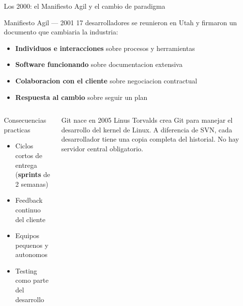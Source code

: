 \documentclass[aspectratio=169]{beamer}
\begin{document}
\begin{frame}{Los 2000: el Manifiesto Agil y el cambio de paradigma}
  \begin{block}{Manifiesto Agil --- 2001}
    17 desarrolladores se reunieron en Utah y firmaron un documento que cambiaria la industria:
    \begin{itemize}
      \item \textbf{Individuos e interacciones} sobre procesos y herramientas
      \item \textbf{Software funcionando} sobre documentacion extensiva
      \item \textbf{Colaboracion con el cliente} sobre negociacion contractual
      \item \textbf{Respuesta al cambio} sobre seguir un plan
    \end{itemize}
  \end{block}

  \vspace{0.3cm}

  \begin{columns}
    \begin{exampleblock}{Consecuencias practicas}
      \begin{itemize}
        \item Ciclos cortos de entrega (\textbf{sprints} de 2 semanas)
        \item Feedback continuo del cliente
        \item Equipos pequenos y autonomos
        \item Testing como parte del desarrollo
      \end{itemize}
    \end{exampleblock}

    \begin{exampleblock}{Git nace en 2005}
      Linus Torvalds crea Git para manejar el desarrollo del kernel de Linux. A diferencia de SVN, cada desarrollador tiene una copia completa del historial. No hay servidor central obligatorio.
    \end{exampleblock}
  \end{columns}
\end{frame}
\end{document}
